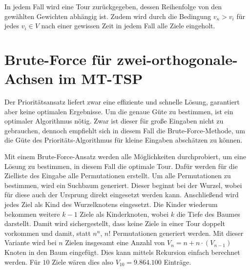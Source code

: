 \documentclass[german,version-2019-11]{uzl-thesis}
\begin{document}
In jedem Fall wird eine Tour zurückgegeben, dessen Reihenfolge von den gewählten Gewichten abhängig ist. Zudem wird durch die Bedingung $v_\kappa>v_i$ für jedes $v_i\in V$ nach einer gewissen Zeit in jedem Fall alle Ziele eingeholt.

\section{Brute-Force für zwei-orthogonale-Achsen im MT-TSP}

Der Prioritätsansatz liefert zwar eine effiziente und schnelle Lösung, garantiert aber keine optimalen Ergebnisse. Um die genaue Güte zu bestimmen, ist ein optimaler Algorithmus nötig. Zwar ist dieser für große Eingaben nicht zu gebrauchen, dennoch empfiehlt sich in diesem Fall die Brute-Force-Methode, um die Güte des Prioritäts-Algorithmus für kleine Eingaben abschätzen zu können. 

Mit einem Brute-Force-Ansatz werden alle Möglichkeiten durchprobiert, um eine \\Lösung zu bestimmen, in diesem Fall die optimale Tour. Dafür werden für die Zielliste des Eingabe alle Permutationen erstellt. Um alle Permutationen zu bestimmen, wird ein Suchbaum generiert. Dieser beginnt bei der Wurzel, wobei für diese auch der Ursprung direkt eingesetzt werden kann. Anschließend wird jedes Ziel als Kind des Wurzelknotens eingesetzt. Die Kinder wiederum bekommen weitere $k-1$ Ziele als Kinderknoten, wobei $k$ die Tiefe des Baumes darstellt. Damit wird sichergestellt, dass keine Ziele in einer Tour doppelt vorkommen und damit, statt $n^n$, $n!$ Permutationen generiert werden. Mit dieser Variante wird bei $n$ Zielen insgesamt eine Anzahl von $V_n = n + n\cdot (V_{n-1})$ Knoten in den Baum eingefügt. Dies kann mittels Rekursion einfach berechnet werden. Für $10$ Ziele wären dies also $V_{10}=9.864.100$ Einträge.
\end{document}
